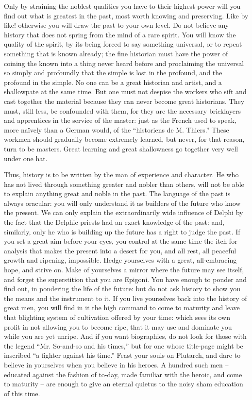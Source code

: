 Only by straining the noblest qualities you have to their highest
power will you find out what is greatest in the past, most worth
knowing and preserving. Like by like! otherwise you will draw the
past to your own level. Do not believe any history that does not
spring from the mind of a rare spirit. You will know the quality of
the spirit, by its being forced to say something universal, or to
repeat something that is known already; the fine historian must have
the power of coining the known into a thing never heard before and
proclaiming the universal so simply and profoundly that the simple is
lost in the profound, and the profound in the simple. No one can be a
great historian and artist, and a shallowpate at the same time. But
one must not despise the workers who sift and cast together the
material because they can never become great historians. They must,
still less, be confounded with them, for they are the necessary
bricklayers and apprentices in the service of the master: just as the
French used to speak, more naïvely than a German would, of the
\enquote{historiens de M. Thiers.} These workmen should gradually become
extremely learned, but never, for that reason, turn to be masters.
Great learning and great shallowness go together very well under one
hat.

Thus, history is to be written by the man of experience and
character. He who has not lived through something greater and nobler
than others, will not be able to explain anything great and noble in
the past. The language of the past is always oracular: you will only
understand it as builders of the future who know the present. We can
only explain the extraordinarily wide influence of Delphi by the fact
that the Delphic priests had an exact knowledge of the past: and,
similarly, only he who is building up the future has a right to judge
the past. If you set a great aim before your eyes, you control at the
same time the itch for analysis that makes the present into a desert
for you, and all rest, all peaceful growth and ripening, impossible.
Hedge yourselves with a great, all-embracing hope, and strive on.
Make of yourselves a mirror where the future may see itself, and
forget the superstition that you are Epigoni. You have enough to
ponder and find out, in pondering the life of the future: but do not
ask history to show you the means and the instrument to it. If you
live yourselves back into the history of great men, you will find in
it the high command to come to maturity and leave that blighting
system of cultivation offered by your time: which sees its own profit
in not allowing you to become ripe, that it may use and dominate you
while you are yet unripe. And if you want biographies, do not look
for those with the legend \enquote{Mr. So-and-so and his times,} but for one
whose title-page might be inscribed \enquote{a fighter against his time.}
Feast your souls on Plutarch, and dare to believe in yourselves when
you believe in his heroes. A hundred such men -- educated against the
fashion of to-day, made familiar with the heroic, and come to
maturity -- are enough to give an eternal quietus to the noisy sham
education of this time.
